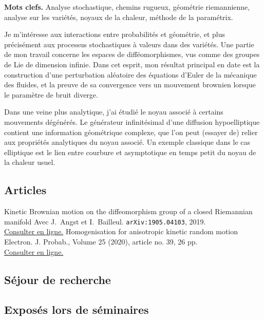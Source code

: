 \documentclass[11pt]{moderncv}
\newcommand\Colorhref[2]{\href{#1}{\color{magenta}#2}}
\begin{document}
\textbf{Mots clefs.} Analyse stochastique, chemins rugueux, géométrie riemannienne, analyse sur les variétés, noyaux de la chaleur, méthode de la paramétrix.

\medskip

Je m'intéresse aux interactions entre probabilités et géométrie, et plus précisément aux processus stochastiques à valeurs dans des variétés. Une partie de mon travail concerne les espaces de difféomorphismes, vus comme des groupes de Lie de dimension infinie. Dans cet esprit, mon résultat principal en date est la construction d'une perturbation aléatoire des équations d'Euler de la mécanique des fluides, et la preuve de sa convergence vers un mouvement brownien lorsque le paramètre de bruit diverge.

\smallskip

Dans une veine plus analytique, j'ai étudié le noyau associé à certains mouvements dégénérés. Le générateur infinitésimal d'une diffusion hypoelliptique contient une information géométrique complexe, que l'on peut (essayer de) relier aux propriétés analytiques du noyau associé. Un exemple classique dans le cas elliptique est le lien entre courbure et asymptotique en temps petit du noyau de la chaleur usuel.

\subsection{Articles}
   {Kinetic Brownian motion on the diffeomorphism group of a closed Riemannian manifold}{}{}{}
   {Avec J.~Angst et I.~Bailleul. \texttt{arXiv:1905.04103}, 2019. \\ \Colorhref{https://arxiv.org/abs/1905.04103}{Consulter en ligne.}}
   {Homogenisation for anisotropic kinetic random motion}{}{}{}
   {Electron. J. Probab., Volume 25 (2020), article no. 39, 26 pp. \\ \Colorhref{https://projecteuclid.org/euclid.ejp/1585620094}{Consulter en ligne.}}

\subsection{Séjour de recherche}


\subsection{Exposés lors de séminaires}
\end{document}
